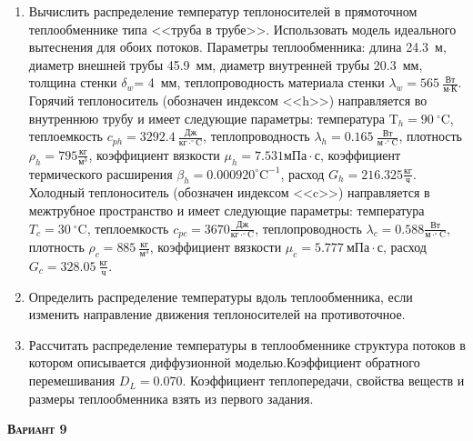 \begin{enumerate} 
\item Вычислить распределение температур теплоносителей в прямоточном теплообменнике типа <<труба в трубе>>. Использовать модель идеального вытеснения для обоих потоков. Параметры теплообменника: длина  24.3~м, диаметр внешней трубы 45.9~мм,  диаметр внутренней трубы 20.3~мм, толщина стенки $\delta_{w}$=     4~мм,  теплопроводность материала стенки $\lambda_{w}=  565~\frac{\text{Вт}}{\text{м} \cdot \text{К}}$.  Горячий теплоноситель (обозначен индексом <<h>>) направляется во внутреннюю трубу и	 имеет следующие параметры: температура $\text{T}_{h}=  90~^\circ\mathrm{C}$, теплоемкость	  $c_{p{h}}= 3292.4~\frac{\text{Дж}}{\text{кг} \cdot ^\circ\mathrm{C}}$, теплопроводность 		$\lambda_{h}= 0.165~\frac{\text{Вт}}{\text{м} \cdot ^\circ\mathrm{C}}$, плотность 		$\rho_{h}=  795 \frac{\text{кг}}{\text{м}^3}$, коэффициент вязкости $\mu_{h}=7.531 \text{мПа} 		\cdot \text{с} $, коэффициент термического расширения $\beta_{h}=0.000920 ^\circ\mathrm{C}^{-1}$,		 расход $G_{h}= 216.325 \frac{\text{кг}}{\text{ч}}$. Холодный теплоноситель (обозначен индексом <<c>>) 		 направляется в межтрубное пространство и имеет следующие параметры: температура $T_{c}=   30		 ~^\circ\mathrm{C}$, теплоемкость $c_{p{c}}= 3670 \frac{\text{Дж}}{\text{кг} \cdot ^\circ\mathrm{C}}$,			 теплопроводность $\lambda_{c}=0.588 \frac{\text{Вт}}{\text{м} \cdot ^\circ\mathrm{C}}$, плотность 			 $\rho_{c}=   885~\frac{\text{кг}}{\text{м}^3}$, коэффициент вязкости $\mu_{c}=5.777~\text{мПа} \cdot \text{с} $, 			 расход $G_{c}=328.05~\frac{\text{кг}}{\text{ч}}$. 

\item Определить распределение температуры вдоль теплообменника, если 	изменить направление движения теплоносителей на противоточное.

\item Рассчитать распределение температуры в теплообменнике структура потоков в котором описывается диффузионной моделью.Коэффициент обратного перемешивания $D_L = $0.070. Коэффициент теплопередачи, свойства веществ и размеры теплообменника взять из первого задания. 

\end{enumerate}

\textsc{\textbf{Вариант 9}}

